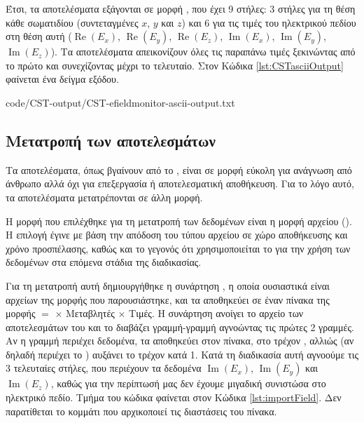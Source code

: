 Έτσι, τα αποτελέσματα εξάγονται σε μορφή , που έχει 9 στήλες: 3 στήλες για τη θέση κάθε σωματιδίου (συντεταγμένες $x$, $y$ και $z$) και 6 για τις τιμές του ηλεκτρικού πεδίου στη θέση αυτή ($\operatorname{Re}(E_x)$, $\operatorname{Re}(E_y)$, $\operatorname{Re}(E_z)$, $\operatorname{Im}(E_x)$, $\operatorname{Im}(E_y)$, $\operatorname{Im}(E_z)$).
Τα αποτελέσματα απεικονίζουν όλες τις παραπάνω τιμές ξεκινώντας από το πρώτο  και συνεχίζοντας μέχρι το τελευταίο.
Στον Κώδικα \ref{lst:CSTasciiOutput} φαίνεται ένα δείγμα εξόδου.


{code/CST-output/CST-efieldmonitor-ascii-output.txt}

\subsection{Μετατροπή των αποτελεσμάτων}

Τα αποτελέσματα, όπως βγαίνουν από το , είναι σε μορφή εύκολη για ανάγνωση από άνθρωπο αλλά όχι για επεξεργασία ή αποτελεσματική αποθήκευση. 
Για το λόγο αυτό, τα αποτελέσματα μετατρέπονται σε άλλη μορφή. 

Η μορφή που επιλέχθηκε για τη μετατροπή των δεδομένων είναι η μορφή αρχείου  ().
Η επιλογή έγινε με βάση την απόδοση του τύπου αρχείου σε χώρο αποθήκευσης και χρόνο προσπέλασης, καθώς και το γεγονός ότι χρησιμοποιείται το  για την χρήση των δεδομένων στα επόμενα στάδια της διαδικασίας.

Για τη μετατροπή αυτή δημιουργήθηκε η συνάρτηση , η οποία ουσιαστικά είναι  αρχείων της μορφής που παρουσιάστηκε, και τα αποθηκεύει σε έναν πίνακα της μορφής  $=$  $\times$ Μεταβλητές $\times$ Τιμές.
Η συνάρτηση ανοίγει το αρχείο των αποτελεσμάτων του  και το διαβάζει γραμμή-γραμμή αγνοώντας τις πρώτες 2 γραμμές. 
Αν η γραμμή περιέχει δεδομένα, τα αποθηκεύει στον πίνακα, στο τρέχον , αλλιώς (αν δηλαδή περιέχει το  ) αυξάνει το τρέχον  κατά 1. 
Κατά τη διαδικασία αυτή αγνοούμε τις 3 τελευταίες στήλες, που περιέχουν τα δεδομένα $\operatorname{Im}(E_x)$, $\operatorname{Im}(E_y)$ και $\operatorname{Im}(E_z)$, καθώς για την περίπτωσή μας δεν έχουμε μιγαδική συνιστώσα στο ηλεκτρικό πεδίο.
Τμήμα του κώδικα φαίνεται στον Κώδικα \ref{lst:importField}. 
Δεν παρατίθεται το κομμάτι που αρχικοποιεί τις διαστάσεις του πίνακα.

